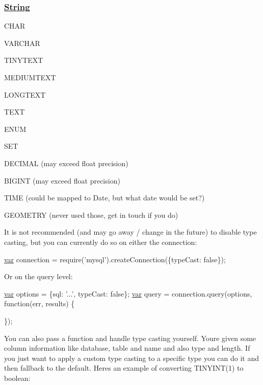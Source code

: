 \subsubsection*{\hyperlink{class_string}{String}}


\begin{DoxyItemize}
\item C\+H\+A\+R
\item V\+A\+R\+C\+H\+A\+R
\item T\+I\+N\+Y\+T\+E\+X\+T
\item M\+E\+D\+I\+U\+M\+T\+E\+X\+T
\item L\+O\+N\+G\+T\+E\+X\+T
\item T\+E\+X\+T
\item E\+N\+U\+M
\item S\+E\+T
\item D\+E\+C\+I\+M\+A\+L (may exceed float precision)
\item B\+I\+G\+I\+N\+T (may exceed float precision)
\item T\+I\+M\+E (could be mapped to Date, but what date would be set?)
\item G\+E\+O\+M\+E\+T\+R\+Y (never used those, get in touch if you do)
\end{DoxyItemize}

It is not recommended (and may go away / change in the future) to disable type casting, but you can currently do so on either the connection\+:


\begin{DoxyCode}
\hyperlink{018__def_8c_a335628f2e9085305224b4f9cc6e95ed5}{var} connection = require(\textcolor{stringliteral}{'mysql'}).createConnection(\{typeCast: \textcolor{keyword}{false}\});
\end{DoxyCode}


Or on the query level\+:


\begin{DoxyCode}
\hyperlink{018__def_8c_a335628f2e9085305224b4f9cc6e95ed5}{var} options = \{sql: \textcolor{stringliteral}{'...'}, typeCast: \textcolor{keyword}{false}\};
\hyperlink{018__def_8c_a335628f2e9085305224b4f9cc6e95ed5}{var} query = connection.query(options, \textcolor{keyword}{function}(err, results) \{

\});
\end{DoxyCode}


You can also pass a function and handle type casting yourself. You\textquotesingle{}re given some column information like database, table and name and also type and length. If you just want to apply a custom type casting to a specific type you can do it and then fallback to the default. Here\textquotesingle{}s an example of converting {\ttfamily T\+I\+N\+Y\+I\+N\+T(1)} to boolean\+:


